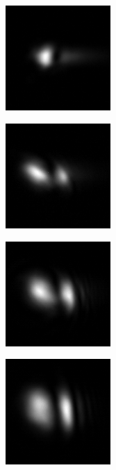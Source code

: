 \begin{figure}[ht]
  \centering
  \begin{subfigure}[b]{4cm}
    \includegraphics[width=4cm,keepaspectratio]{interference/figures/move/123-11.png}
    \caption{}
  \end{subfigure}
  \begin{subfigure}[b]{4cm}
    \includegraphics[width=4cm,keepaspectratio]{interference/figures/move/123-10.png}
    \caption{}
  \end{subfigure}
  \begin{subfigure}[b]{4cm}
    \includegraphics[width=4cm,keepaspectratio]{interference/figures/move/123-9.png}
    \caption{}
  \end{subfigure}
  \begin{subfigure}[b]{4cm}
    \includegraphics[width=4cm,keepaspectratio]{interference/figures/move/123-8.png}
    \caption{}

\end{subfigure}
\end{figure}
